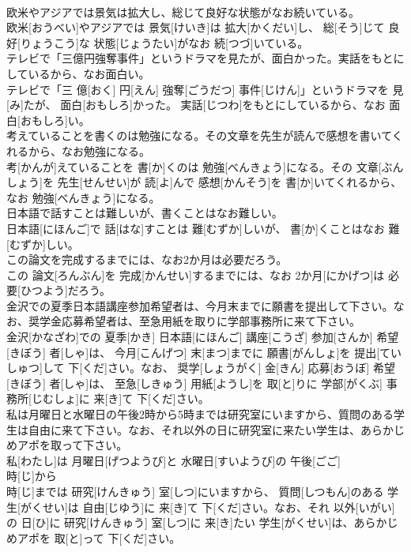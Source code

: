 \documentclass[8pt]{extreport}
\begin{document}
\begin{CJK}{UTF8}{min}
\\	欧米やアジアでは景気は拡大し、総じて良好な状態がなお続いている。	
\\	欧米[おうべい]やアジアでは 景気[けいき]は 拡大[かくだい]し、 総[そう]じて 良好[りょうこう]な 状態[じょうたい]がなお 続[つづ]いている。
\\	テレビで「三億円強奪事件」というドラマを見たが、面白かった。実話をもとにしているから、なお面白い。	
\\	テレビで「三 億[おく] 円[えん] 強奪[ごうだつ] 事件[じけん]」というドラマを 見[み]たが、 面白[おもしろ]かった。 実話[じつわ]をもとにしているから、なお 面白[おもしろ]い。
\\	考えていることを書くのは勉強になる。その文章を先生が読んで感想を書いてくれるから、なお勉強になる。	
\\	考[かんが]えていることを 書[か]くのは 勉強[べんきょう]になる。その 文章[ぶんしょう]を 先生[せんせい]が 読[よ]んで 感想[かんそう]を 書[か]いてくれるから、なお 勉強[べんきょう]になる。
\\	日本語で話すことは難しいが、書くことはなお難しい。	
\\	日本語[にほんご]で 話[はな]すことは 難[むずか]しいが、 書[か]くことはなお 難[むずか]しい。
\\	この論文を完成するまでには、なお2か月は必要だろう。	
\\	この 論文[ろんぶん]を 完成[かんせい]するまでには、なお 2か月[にかげつ]は 必要[ひつよう]だろう。
\\	金沢での夏季日本語講座参加希望者は、今月末までに願書を提出して下さい。なお、奨学金応募希望者は、至急用紙を取りに学部事務所に来て下さい。	
\\	金沢[かなざわ]での 夏季[かき] 日本語[にほんご] 講座[こうざ] 参加[さんか] 希望[きぼう] 者[しゃ]は、 今月[こんげつ] 末[まつ]までに 願書[がんしょ]を 提出[ていしゅつ]して 下[くだ]さい。なお、 奨学[しょうがく] 金[きん] 応募[おうぼ] 希望[きぼう] 者[しゃ]は、 至急[しきゅう] 用紙[ようし]を 取[と]りに 学部[がくぶ] 事務所[じむしょ]に 来[き]て 下[くだ]さい。
\\	私は月曜日と水曜日の午後2時から5時までは研究室にいますから、質問のある学生は自由に来て下さい。なお、それ以外の日に研究室に来たい学生は、あらかじめアポを取って下さい。	
\\	私[わたし]は 月曜日[げつようび]と 水曜日[すいようび]の 午後[ごご] 
\\	時[じ]から 
\\	時[じ]までは 研究[けんきゅう] 室[しつ]にいますから、 質問[しつもん]のある 学生[がくせい]は 自由[じゆう]に 来[き]て 下[くだ]さい。なお、それ 以外[いがい]の 日[ひ]に 研究[けんきゅう] 室[しつ]に 来[き]たい 学生[がくせい]は、あらかじめアポを 取[と]って 下[くだ]さい。

\end{CJK}
\end{document}
